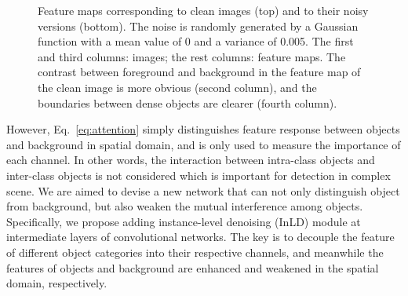 \documentclass[10pt,journal,compsoc]{IEEEtran}
\begin{document}
\begin{figure}[!t]
	\centering
	\caption{Feature maps corresponding to clean images (top) and to their noisy versions (bottom). The noise is randomly generated by a Gaussian function with a mean value of 0 and a variance of 0.005. The first and third columns: images; the rest columns: feature maps. The contrast between foreground and background in the feature map of the clean image is more obvious (second column), and the boundaries between dense objects are clearer (fourth column).}
	\label{fig:noise_visualize}
\end{figure}

However, Eq.~\ref{eq:attention} simply distinguishes feature response between objects and background in spatial domain, and  is only used to measure the importance of each channel. In other words, the interaction between intra-class objects and inter-class objects is not considered which is important for detection in complex scene. We are aimed to devise a new network that can not only distinguish object from background, but also weaken the mutual interference among objects. Specifically, we propose adding instance-level denoising (InLD) module at intermediate layers of convolutional networks. The key is to decouple the feature of different object categories into their respective channels, and meanwhile the features of objects and background are enhanced and weakened in the spatial domain, respectively.
\end{document}

